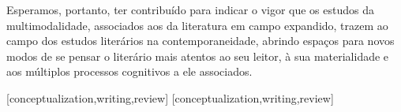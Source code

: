 \documentclass[portuguese]{textolivre}
\begin{document}
Esperamos, portanto, ter contribuído para indicar o vigor que os estudos da
multimodalidade, associados aos da literatura em campo expandido, trazem ao
campo dos estudos literários na contemporaneidade, abrindo espaços para novos
modos de se pensar o literário mais atentos ao seu leitor, à sua materialidade
e aos múltiplos processos cognitivos a ele associados.



\printbibliography\label{sec-bib}
\begin{contributors}
[conceptualization,writing,review]
[conceptualization,writing,review]
\end{contributors}
\end{document}
